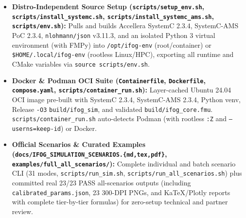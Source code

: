 \documentclass[11pt,a4paper]{article}
\begin{document}
\begin{itemize}
    \item \textbf{Distro-Independent Source Setup (\texttt{scripts/setup\_env.sh}, \texttt{scripts/install\_systemc.sh}, \texttt{scripts/install\_systemc\_ams.sh}, \texttt{scripts/env.sh}):} Pulls and builds Accellera SystemC 2.3.4, SystemC-AMS PoC 2.3.4, \texttt{nlohmann/json} v3.11.3, and an isolated Python 3 virtual environment (with FMPy) into \texttt{/opt/ifog-env} (root/container) or \texttt{\$HOME/.local/ifog-env} (rootless Linux/HPC), exporting all runtime and CMake variables via \texttt{source scripts/env.sh}.
    \item \textbf{Docker \& Podman OCI Suite (\texttt{Containerfile}, \texttt{Dockerfile}, \texttt{compose.yaml}, \texttt{scripts/container\_run.sh}):} Layer-cached Ubuntu 24.04 OCI image pre-built with SystemC 2.3.4, SystemC-AMS 2.3.4, Python venv, Release \texttt{-O3} \texttt{build/ifog\_sim}, and validated \texttt{build/ifog\_core.fmu}. \texttt{scripts/container\_run.sh} auto-detects Podman (with rootless \texttt{:Z} and \texttt{--userns=keep-id}) or Docker.
    \item \textbf{Official Scenarios \& Curated Examples (\texttt{docs/IFOG\_SIMULATION\_SCENARIOS.\{md,tex,pdf\}}, \texttt{examples/full\_all\_scenarios/}):} Complete individual and batch scenario CLI (31 modes, \texttt{scripts/run\_sim.sh}, \texttt{scripts/run\_all\_scenarios.sh}) plus committed real 23/23 PASS all-scenarios outputs (including \texttt{calibrated\_params.json}, 23 300-DPI PNGs, and KaTeX/Plotly reports with complete tier-by-tier formulas) for zero-setup technical and partner review.
\end{itemize}
\end{document}
